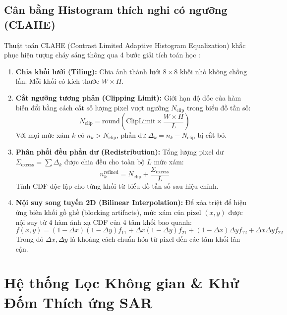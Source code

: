 \subsection{Cân bằng Histogram thích nghi có ngưỡng (CLAHE)}
Thuật toán CLAHE (Contrast Limited Adaptive Histogram Equalization) khắc phục hiện tượng cháy sáng thông qua 4 bước giải tích toán học \cite{reza2004realization}:
\begin{enumerate}
    \item \textbf{Chia khối lưới (Tiling):} Chia ảnh thành lưới $8 \times 8$ khối nhỏ không chồng lấn. Mỗi khối có kích thước $W \times H$.
    \item \textbf{Cắt ngưỡng tương phản (Clipping Limit):} Giới hạn độ dốc của hàm biến đổi bằng cách cắt số lượng pixel vượt ngưỡng $N_{\text{clip}}$ trong biểu đồ tần số:
    \begin{equation}
    N_{\text{clip}} = \text{round}\left( \text{ClipLimit} \times \frac{W \times H}{L} \right)
    \label{eq:clahe_clip}
    \end{equation}
    Với mọi mức xám $k$ có $n_k > N_{\text{clip}}$, phần dư $\Delta_k = n_k - N_{\text{clip}}$ bị cắt bỏ.
    \item \textbf{Phân phối đều phần dư (Redistribution):} Tổng lượng pixel dư $\Sigma_{\text{excess}} = \sum \Delta_k$ được chia đều cho toàn bộ $L$ mức xám:
    \begin{equation}
    n_k^{\text{refined}} = N_{\text{clip}} + \frac{\Sigma_{\text{excess}}}{L}
    \label{eq:clahe_redist}
    \end{equation}
    Tính CDF độc lập cho từng khối từ biểu đồ tần số sau hiệu chỉnh.
    \item \textbf{Nội suy song tuyến 2D (Bilinear Interpolation):} Để xóa triệt để hiệu ứng biên khối gồ ghề (blocking artifacts), mức xám của pixel $(x, y)$ được nội suy từ 4 hàm ánh xạ CDF của 4 tâm khối bao quanh:
    \begin{equation}
    f(x, y) = (1 - \Delta x)(1 - \Delta y) f_{11} + \Delta x(1 - \Delta y) f_{21} + (1 - \Delta x)\Delta y f_{12} + \Delta x \Delta y f_{22}
    \label{eq:bilinear}
    \end{equation}
    Trong đó $\Delta x, \Delta y$ là khoảng cách chuẩn hóa từ pixel đến các tâm khối lân cận.
\end{enumerate}



\section{Hệ thống Lọc Không gian \& Khử Đốm Thích ứng SAR}
